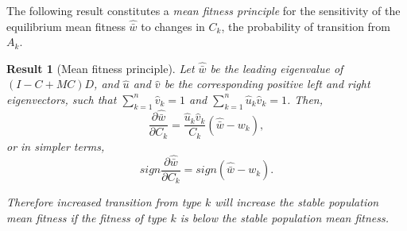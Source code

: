 \documentclass[9pt, a4paper, twocolumn]{extarticle}
\newtheorem{result}{Result}
\begin{document}
The following result constitutes a \emph{mean fitness principle} for the
sensitivity of the equilibrium mean fitness $\hat{\bar w}$ to changes
in $C_k$, the probability of transition from $A_k$.
\medskip

\begin{result}[Mean fitness principle]\label{result:mfp}
Let $\hat{\bar w}$ be the leading eigenvalue of $(I-C+MC)D$,
and $\hat u$ and $\hat v$ be the corresponding positive left and right eigenvectors, such that $\sum_{k=1}^{n}\hat v_k=1$ and $\sum_{k=1}^{n}\hat u_k\hat v_k=1$.
Then,
\begin{equation}\label{eq:mfp}
\frac{\partial \hat{\bar w}}{\partial C_k} = 
\frac{\hat u_k \hat v_k}{C_k} (\hat{\bar w} - w_k),
\end{equation}
or in simpler terms,
\begin{equation}\label{eq:mfp_sign}
sign\frac{\partial \hat{\bar w}}{\partial C_k} = 
sign(\hat{\bar w} - w_k).
\end{equation}

Therefore increased transition from type $k$ will increase the stable population mean fitness if the fitness of type $k$ is below the stable population mean fitness.
\end{result}
\end{document}
